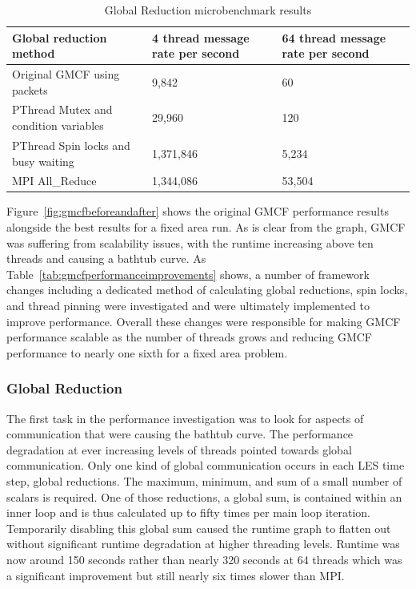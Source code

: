 \begin{table}[t]
    \centering
    \begin{tabular}{|l|l|l|}
        \hline
        Global reduction method &
        4 thread message rate per second &
        64 thread message rate per second\\
        \hline
        Original GMCF using packets & 9,842 & 60\\
        \hline
        PThread Mutex and condition variables & 29,960 & 120\\
        \hline
        PThread Spin locks and busy waiting & 1,371,846 & 5,234\\
        \hline
        MPI All\_Reduce & 1,344,086 & 53,504\\
        \hline
    \end{tabular}
    \caption{Global Reduction microbenchmark results}
    \label{tab:gmcfglobalreductionresults}
\end{table}

Figure~\ref{fig:gmcfbeforeandafter} shows the original GMCF performance results
alongside the best results for a fixed area run. As is clear from the graph,
GMCF was suffering from scalability issues, with the runtime increasing above
ten threads and causing a bathtub curve. As
Table~\ref{tab:gmcfperformanceimprovements} shows, a number of framework changes
including a dedicated method of calculating global reductions, spin locks, and
thread pinning were investigated and were ultimately implemented to improve
performance. Overall these changes were responsible for making GMCF performance
scalable as the number of threads grows and reducing GMCF performance to nearly
one sixth for a fixed area problem.

\subsubsection{Global Reduction}

The first task in the performance investigation was to look for aspects of
communication that were causing the bathtub curve. The performance degradation
at ever increasing levels of threads pointed towards global communication. Only
one kind of global communication occurs in each LES time step, global
reductions. The maximum, minimum, and sum of a small number of scalars is
required. One of those reductions, a global sum, is contained within an inner
loop and is thus calculated up to fifty times per main loop iteration.
Temporarily disabling this global sum caused the runtime graph to flatten out
without significant runtime degradation at higher threading levels. Runtime was
now around 150 seconds rather than nearly 320 seconds at 64 threads which was a
significant improvement but still nearly six times slower than MPI.

